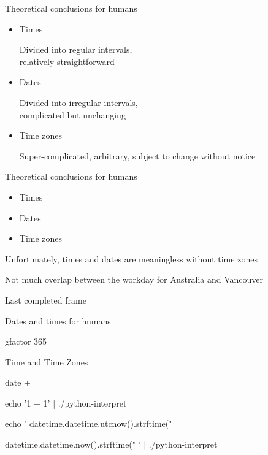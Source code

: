 \documentclass[xcolor=svgnames,17pt]{beamer}
\begin{document}
\begin{frame}{Theoretical conclusions for humans}

\begin{itemize}
\item Times

Divided into regular intervals, \\
relatively straightforward

\item Dates

Divided into irregular intervals, \\
complicated but unchanging

\item Time zones

Super-complicated, arbitrary,
subject to change without notice

\end{itemize}

\end{frame}

\begin{frame}{Theoretical conclusions for humans}

\begin{itemize}
\item Times
\item Dates
\item Time zones
\end{itemize}

Unfortunately, times and dates are meaningless without time zones

Not much overlap between the workday for Australia and Vancouver

\end{frame}

\begin{frame}{Last completed frame}
\end{frame}

\begin{frame}[fragile]{Dates and times for humans}

\bash[stdout,script,prefix=$\space]
gfactor 365
\END

\end{frame}

\begin{frame}[fragile]{Time and Time Zones}

\bash[script,stdout,prefix=$\space]
date +%
\END

\bash[stdout,prefix=$\space]
echo '1 + 1' | ./python-interpret
\END

\bash[stdout]
echo '
datetime.datetime.utcnow().strftime("%


datetime.datetime.now().strftime("%
' | ./python-interpret
\END

\end{frame}
\end{document}
